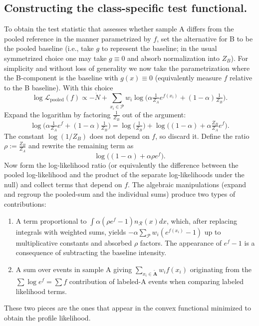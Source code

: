 \documentclass{article}
\begin{document}
\subsection{Constructing the class-specific test functional.}
To obtain the test statistic that assesses whether sample A differs from the pooled reference in the manner parametrized by \(f\), set the alternative for B to be the pooled baseline (i.e., take \(g\) to represent the baseline; in the usual symmetrized choice one may take \(g\equiv0\) and absorb normalization into \(Z_B\)). For simplicity and without loss of generality we now take the parametrization where the B-component is the baseline with \(g(x)\equiv 0\) (equivalently measure \(f\) relative to the B baseline). With this choice
\[
\log\mathcal{L}_{\text{pooled}}(f) \propto -\dot{N} + \sum_{x_i\in\mathcal{P}} w_i \log\Big(\alpha \tfrac{1}{Z_A}e^{f(x_i)} + (1-\alpha)\tfrac{1}{Z_B}\Big).
\]
Expand the logarithm by factoring \(\tfrac{1}{Z_B}\) out of the argument:
\[
\log\Big(\alpha \tfrac{1}{Z_A}e^{f} + (1-\alpha)\tfrac{1}{Z_B}\Big) = \log\Big(\tfrac{1}{Z_B}\Big) + \log\Big((1-\alpha) + \alpha\tfrac{Z_B}{Z_A}e^{f}\Big).
\]
The constant \(\log(1/Z_B)\) does not depend on \(f\), so discard it. Define the ratio \(\rho:=\tfrac{Z_B}{Z_A}\) and rewrite the remaining term as
\[
\log\Big((1-\alpha) + \alpha\rho e^{f}\Big).
\]
Now form the log-likelihood ratio (or equivalently the difference between the pooled log-likelihood and the product of the separate log-likelihoods under the null) and collect terms that depend on \(f\). The algebraic manipulations (expand and regroup the pooled-sum and the individual sums) produce two types of contributions:
\begin{enumerate}
    \item A term proportional to \(\int \alpha (\rho e^{f}-1) n_{\mathcal{R}}(x)dx\), which, after replacing integrals with weighted sums, yields \(-\alpha\sum_{\mathcal{P}} w_i (e^{f(x_i)}-1)\) up to multiplicative constants and absorbed \(\rho\) factors. The appearance of \(e^{f}-1\) is a consequence of subtracting the baseline intensity.
    \item A sum over events in sample A giving \(\sum_{x_i\in\tilde{\mathbf{A}}} w_i f(x_i)\) originating from the \(\sum\log e^{f}=\sum f\) contribution of labeled-A events when comparing labeled likelihood terms.
\end{enumerate}
These two pieces are the ones that appear in the convex functional minimized to obtain the profile likelihood.
\end{document}
